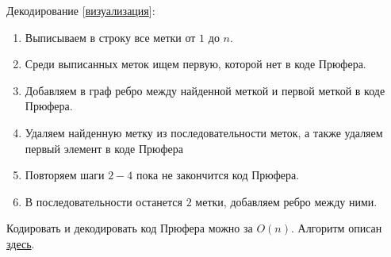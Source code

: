 Декодирование
[\href{https://www.youtube.com/watch?v=7s44l7gWEVk}{визуализация}]:
\begin{enumerate}
  \item Выписываем в строку все метки от \(1\) до \(n\).
  \item Среди выписанных меток ищем первую, которой нет в коде Прюфера.
  \item Добавляем в граф ребро между найденной меткой и первой меткой в коде
  Прюфера.
  \item Удаляем найденную метку из последовательности меток, а также удаляем
  первый элемент в коде Прюфера
  \item Повторяем шаги \(2-4\) пока не закончится код Прюфера.
  \item В последовательности останется \(2\) метки, добавляем ребро между ними.
\end{enumerate}

\begin{remark}
  Кодировать и декодировать код Прюфера можно за \(O(n)\). Алгоритм описан
  \href{https://www.scirp.org/pdf/JSEA20090200006_93737200.pdf}{здесь}.
\end{remark}